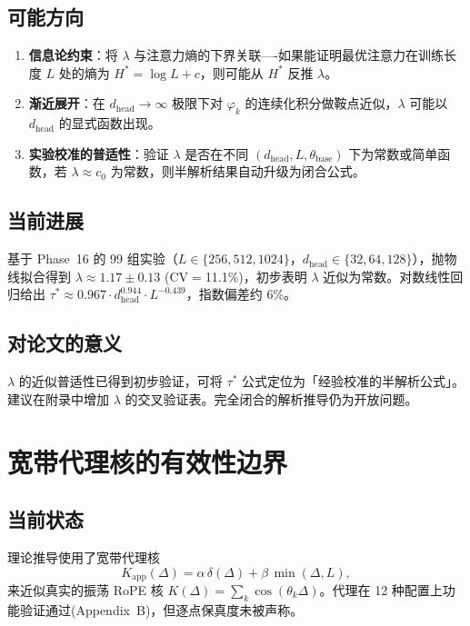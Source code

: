 \documentclass[11pt,a4paper]{article}
\newcommand{\zh}[1]{{\zhfont #1}}
\begin{document}
\subsection*{\zh{可能方向}}
\begin{enumerate}[leftmargin=2em]
  \item \textbf{\zh{信息论约束}}\zh{：将} $\lambda$ \zh{与注意力熵的下界关联}----\zh{如果能证明最优注意力在训练长度} $L$ \zh{处的熵为} $H^* = \log L + c$\zh{，则可能从} $H^*$ \zh{反推} $\lambda$\zh{。}
  \item \textbf{\zh{渐近展开}}\zh{：在} $d_{\mathrm{head}} \to \infty$ \zh{极限下对} $\varphi_k$ \zh{的连续化积分做鞍点近似，}$\lambda$ \zh{可能以} $d_{\mathrm{head}}$ \zh{的显式函数出现。}
  \item \textbf{\zh{实验校准的普适性}}\zh{：验证} $\lambda$ \zh{是否在不同} $(d_{\mathrm{head}}, L, \theta_{\mathrm{base}})$ \zh{下为常数或简单函数，若} $\lambda \approx c_0$ \zh{为常数，则半解析结果自动升级为闭合公式。}
\end{enumerate}

\subsection*{\zh{当前进展}}
\zh{基于} Phase~16 \zh{的} 99 \zh{组实验（}$L \in \{256,512,1024\}$\zh{，}$d_{\mathrm{head}} \in \{32,64,128\}$\zh{），抛物线拟合得到} $\lambda \approx 1.17 \pm 0.13$ (CV$=$11.1\%)\zh{，初步表明} $\lambda$ \zh{近似为常数。对数线性回归给出} $\tau^* \approx 0.967 \cdot d_{\mathrm{head}}^{0.944} \cdot L^{-0.439}$\zh{，指数偏差约} 6\%\zh{。}

\subsection*{\zh{对论文的意义}}
$\lambda$ \zh{的近似普适性已得到初步验证，可将} $\tau^*$ \zh{公式定位为「经验校准的半解析公式」。建议在附录中增加} $\lambda$ \zh{的交叉验证表。完全闭合的解析推导仍为开放问题。}

\vspace{12pt}

\section{\zh{宽带代理核的有效性边界}}

\subsection*{\zh{当前状态}}
\zh{理论推导使用了宽带代理核}
\begin{equation}
  K_{\mathrm{app}}(\Delta) = \alpha\,\delta(\Delta) + \beta\,\min(\Delta, L),
  \label{eq:surrogate}
\end{equation}
\zh{来近似真实的振荡} RoPE \zh{核} $K(\Delta) = \sum_k \cos(\theta_k \Delta)$\zh{。代理在} 12 \zh{种配置上功能验证通过}(Appendix~B)\zh{，但逐点保真度未被声称。}
\end{document}
